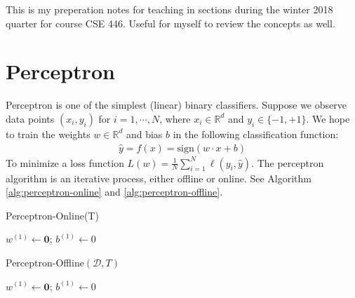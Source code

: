 \documentclass[12pt]{article}
\title{}
\theoremstyle{definition}
\begin{document}
\pagestyle{fancy}
\fancyhf{} %
\cfoot{\thepage}
\renewcommand{\headrulewidth}{1pt}

This is my preperation notes for teaching in sections during the winter 2018 quarter for course CSE 446. Useful for myself to review the concepts as well.

\section{Perceptron}

Perceptron is one of the simplest (linear) binary classifiers. Suppose we observe data points $(x_i, y_i)$ for $i=1,\cdots,N$, where $x_i\in\mathbb{R}^d$ and $y_i\in\{-1,+1\}$. We hope to train the weights $w\in\mathbb{R}^d$ and bias $b$ in the following classification function:
\begin{align}
\hat{y}=f(x)=\text{sign}(w\cdot x+b)
\end{align}
To minimize a loss function $L(w) = \frac{1}{N}\sum_{i=1}^N\ell(y_i, \hat{y})$. The perceptron algorithm is an iterative process, either offline or online. See Algorithm \ref{alg:perceptron-online} and \ref{alg:perceptron-offline}.


\begin{algorithm}[h]
    \caption{Perceptron-Online(T)}
    \label{alg:perceptron-online}
    $w^{(1)}\gets \bm{0}$; $b^{(1)}\gets 0$\;
\end{algorithm}

\begin{algorithm}[h]
    \caption{Perceptron-Offline$(\mathcal{D},T)$}
    \label{alg:perceptron-offline}
    $w^{(1)}\gets \bm{0}$; $b^{(1)}\gets 0$\;
\end{algorithm}
\end{document}
